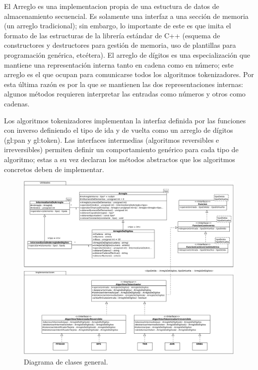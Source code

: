 El Arreglo es una implementacion propia de una estuctura de datos de
almacenamiento secuencial. Es solamente una interfaz a una sección
de memoria (un arreglo tradicional); sin embargo, lo importante de este es
que imita el formato de las estructuras de la librería estándar de C++
(esquema de constructores y destructores para gestión de memoria, uso
de plantillas para programación genérica, etcétera). El arreglo de dígitos es
una especialización que mantiene una representación interna tanto en cadena como
en número; este arreglo es el que ocupan para comunicarse todos los
algoritmos tokenizadores. Por esta última razón es por la que se
mantienen las dos representaciones internas: algunos métodos requieren
interpretar las entradas como números y otros como cadenas.

Los algoritmos tokenizadores implementan la interfaz definida por las
funciones con inverso definiendo el tipo de ida y de vuelta como un
arreglo de dígitos (\gls{gl:pan} y \gls{gl:token}). Las interfaces intermedias
(algoritmos reversibles e irreversibles) permiten definir un comportamiento
genérico para cada tipo de algoritmo; estas a su vez declaran los métodos
abstractos que los algoritmos concretos deben de implementar.

\begin{figure}
  \begin{center}
    \includegraphics[width=1.0\linewidth]{diagramas/diagrama_general.png}
    \caption{Diagrama de clases general.}
    \label{clases_general}
  \end{center}
\end{figure}

